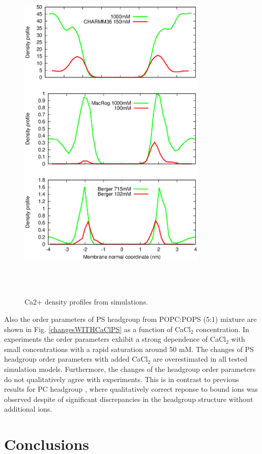 \documentclass[aps,prl,superscriptaddress,twocolumn]{revtex4}
\begin{document}
\begin{figure}[]
  \centering
  \includegraphics[width=9cm]{../Figs/CAdensPCPSmixture.eps}
  \caption{\label{CAdensPCPSmixture}
    Ca2+ density profiles from simulations.
  }
   \\
   \\
\end{figure}


Also the order parameters of PS headgroup from POPC:POPS (5:1) mixture
are shown in Fig. \ref{changesWITHCaClPS} as a function of CaCl$_2$ concentration.
In experiments the order parameters exhibit a strong dependence of CaCl$_2$ with
small concentrations with a rapid saturation around 50 mM. 
The changes of PS headgroup order parameters with added CaCl$_2$ are overestimated in
all tested simulation models. Furthermore, the changes of the headgroup order parameters
do not qualitatively agree with experiments. This is in contrast to previous results
for PC headgroup \cite{catte16}, where qualitatively correct reponse to bound ions was
observed despite of significant discrepancies in the headgroup structure without additional ions. 


\section{Conclusions}
\end{document}

